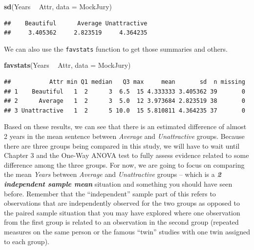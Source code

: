 \documentclass[]{book}
\newenvironment{Shaded}{\begin{snugshade}}{\end{snugshade}}
\newcommand{\KeywordTok}[1]{\textcolor[rgb]{0.13,0.29,0.53}{\textbf{#1}}}
\newcommand{\DataTypeTok}[1]{\textcolor[rgb]{0.13,0.29,0.53}{#1}}
\newcommand{\StringTok}[1]{\textcolor[rgb]{0.31,0.60,0.02}{#1}}
\newcommand{\OperatorTok}[1]{\textcolor[rgb]{0.81,0.36,0.00}{\textbf{#1}}}
\newcommand{\NormalTok}[1]{#1}
\theoremstyle{definition}
\theoremstyle{definition}
\theoremstyle{remark}
\begin{document}
\begin{Shaded}
\begin{Highlighting}[]
\KeywordTok{sd}\NormalTok{(Years }\OperatorTok{~}\StringTok{ }\NormalTok{Attr, }\DataTypeTok{data =}\NormalTok{ MockJury)}
\end{Highlighting}
\end{Shaded}

\begin{verbatim}
##    Beautiful      Average Unattractive 
##     3.405362     2.823519     4.364235
\end{verbatim}

We can also use the \texttt{favstats} function to get those summaries
and others.

\begin{Shaded}
\begin{Highlighting}[]
\KeywordTok{favstats}\NormalTok{(Years }\OperatorTok{~}\StringTok{ }\NormalTok{Attr, }\DataTypeTok{data =}\NormalTok{ MockJury)}
\end{Highlighting}
\end{Shaded}

\begin{verbatim}
##           Attr min Q1 median   Q3 max     mean       sd  n missing
## 1    Beautiful   1  2      3  6.5  15 4.333333 3.405362 39       0
## 2      Average   1  2      3  5.0  12 3.973684 2.823519 38       0
## 3 Unattractive   1  2      5 10.0  15 5.810811 4.364235 37       0
\end{verbatim}

Based on these results, we can see that there is an estimated difference
of almost 2 years in the mean sentence between \emph{Average} and
\emph{Unattractive} groups. Because there are three groups being
compared in this study, we will have to wait until Chapter 3 and the
One-Way ANOVA test to fully assess evidence related to some difference
among the three groups. For now, we are going to focus on comparing the
mean \emph{Years} between \emph{Average} and \emph{Unattractive} groups
-- which is a \textbf{\emph{2 independent sample mean}} situation and
something you should have seen before. Remember that the ``independent''
sample part of this refers to observations that are independently
observed for the two groups as opposed to the paired sample situation
that you may have explored where one observation from the first group is
related to an observation in the second group (repeated measures on the
same person or the famous ``twin'' studies with one twin assigned to
each group).
\end{document}
